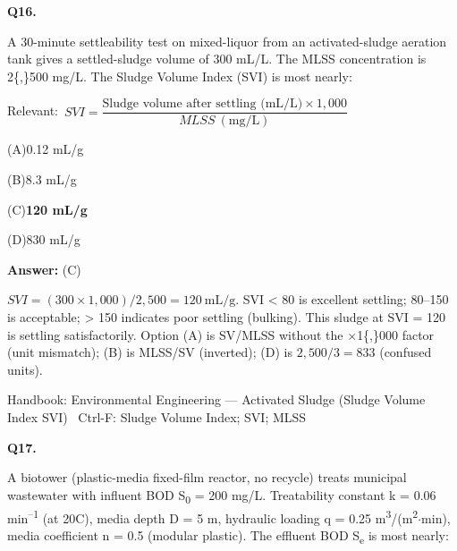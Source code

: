 \documentclass[11pt]{article}
\newcommand{\correct}[1]{\textbf{#1}\;{\color{accent}$\checkmark$}}
\newcommand{\optline}[2]{\par\noindent\hspace{1.2em}(#1)\hspace{0.6em}#2}
\begin{document}
\vspace{9pt}
\filbreak
\textbf{\color{accent}Q16.}\par\vspace{2pt}
A 30-minute settleability test on mixed-liquor from an activated-sludge aeration tank gives a settled-sludge volume of 300 mL/L. The MLSS concentration is 2\{,\}500 mg/L. The Sludge Volume Index (SVI) is most nearly:\par\vspace{3pt}
{\small\color{soft}Relevant:}\ $SVI = \dfrac{\text{Sludge volume after settling (mL/L)}\times 1{,}000}{MLSS\ (\mathrm{mg/L})}$\par\vspace{3pt}
\optline{A}{0.12 mL/g}
\optline{B}{8.3 mL/g}
\optline{C}{\correct{120 mL/g}}
\optline{D}{830 mL/g}
\par\vspace{3pt}
\vspace{2pt}\par\noindent\colorbox{boxbg}{\parbox{\dimexpr\linewidth-2\fboxsep\relax}{%
\vspace{2pt}\textbf{Answer:} (C)\par\vspace{2pt}
{\small $SVI = (300\times1{,}000)/2{,}500 = 120\ \mathrm{mL/g}$. SVI < 80 is excellent settling; 80--150 is acceptable; > 150 indicates poor settling (bulking). This sludge at SVI = 120 is settling satisfactorily. Option (A) is SV/MLSS without the $\times$1\{,\}000 factor (unit mismatch); (B) is MLSS/SV (inverted); (D) is $2{,}500/3 = 833$ (confused units).}\par\vspace{2pt}
{\footnotesize\color{soft}Handbook: Environmental Engineering --- Activated Sludge (Sludge Volume Index SVI) \textbullet\ Ctrl-F: Sludge Volume Index; SVI; MLSS}\vspace{2pt}
}}
\vspace{9pt}
\filbreak
\textbf{\color{accent}Q17.}\par\vspace{2pt}
A biotower (plastic-media fixed-film reactor, no recycle) treats municipal wastewater with influent BOD S\textsubscript{0} = 200 mg/L. Treatability constant k = 0.06 min\textsuperscript{--}\textsuperscript{1} (at 20\textdegree{}C), media depth D = 5 m, hydraulic loading q = 0.25 m\textsuperscript{3}/(m\textsuperscript{2}$\cdot$min), media coefficient n = 0.5 (modular plastic). The effluent BOD S\textsubscript{e} is most nearly:\par\vspace{3pt}
\end{document}
